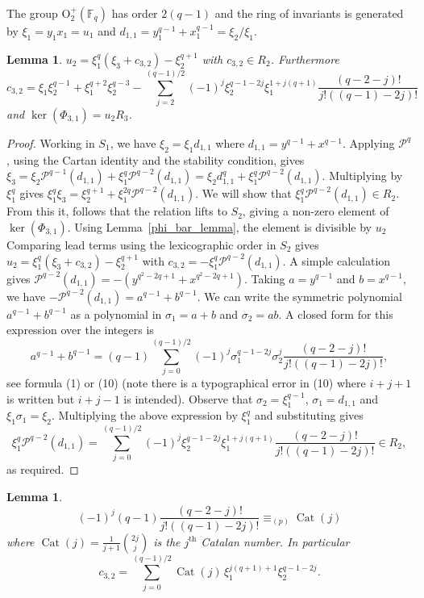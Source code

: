 \documentclass{amsart}
\newcommand{\field}{\mathbb{F}}
\newcommand{\orthp}[2]{{{\text{O}^{+}_{{#1}}(\field_{#2})}}}
\newcommand{\PP}{\mathcal{P}}
\newtheorem{lem}[subsection]{Lemma}
\DeclareMathOperator{\Cat}{{Cat}}
\begin{document}
The group $\orthp{2}{q}$ has order $2(q-1)$ and the ring of invariants is generated by $\xi_1=y_1x_1=u_1$ and $d_{1,1}=y_1^{q-1}+x_1^{q-1}=\xi_2/\xi_1$.


\begin{lem}\label{u2lem} $u_2=\xi_1^q(\xi_3+c_{3,2})-\xi_2^{q+1}$ with $c_{3,2}\in R_2$. 
 Furthermore 
 $$c_{3,2}=\xi_1\xi_2^{q-1}+\xi_1^{q+2}\xi_2^{q-3}-\sum_{j=2}^{(q-1)/2}(-1)^j\xi_2^{q-1-2j}\xi_1^{1+j(q+1)}\frac{(q-2-j)!}{j!((q-1)-2j)!}$$
 and $\ker(\Phi_{3,1})=u_2R_3$.
 \end{lem}
 \begin{proof} Working in $S_1$, we have $\xi_2=\xi_1d_{1,1}$ where $d_{1,1}=y^{q-1}+x^{q-1}$. Applying $\PP^q$, using the Cartan identity and the stability condition, gives
 $\xi_3=\xi_2\PP^{q-1}(d_{1,1})+\xi_1^q\PP^{q-2}(d_{1,1})=\xi_2d_{1,1}^q+\xi_1^q\PP^{q-2}(d_{1,1})$. 
 Multiplying by $\xi_1^q$ gives $\xi_1^q\xi_3=\xi_2^{q+1}+\xi_1^{2q}\PP^{q-2}(d_{1,1})$.
 We will show that $\xi_1^{q}\PP^{q-2}(d_{1,1})\in R_2$. From this it, follows that the relation lifts to $S_2$, giving a non-zero element of $\ker(\Phi_{3,1})$.
 Using Lemma~\ref{phi_bar_lemma}, the element is divisible by $u_2$
 Comparing lead terms using the lexicographic order in $S_2$ gives $u_2=\xi_1^q(\xi_3+c_{3,2})-\xi_2^{q+1}$ with 
 $c_{3,2}=-\xi_1^{q}\PP^{q-2}(d_{1,1})$.
 A simple calculation gives $\PP^{q-2}(d_{1,1})=-(y^{q^2-2q+1}+x^{q^2-2q+1})$. Taking $a=y^{q-1}$ and $b=x^{q-1}$, we have $-\PP^{q-2}(d_{1,1})=a^{q-1}+b^{q-1}$.
 We can write the symmetric polynomial $a^{q-1}+b^{q-1}$ as a polynomial in $\sigma_1=a+b$ and $\sigma_2=ab$. A closed form for this expression over the integers is
 $$a^{q-1}+b^{q-1}=(q-1)\sum_{j=0}^{(q-1)/2}(-1)^j\sigma_1^{q-1-2j}\sigma_2^j\frac{(q-2-j)!}{j!((q-1)-2j)!},$$
 see \cite{gould:99} formula (1) or (10) (note there is a typographical error in \cite{gould:99}(10)
 where $i+j+1$ is written but $i+j-1$ is intended).   
 Observe that $\sigma_2=\xi_1^{q-1}$, $\sigma_1=d_{1,1}$ and $\xi_1\sigma_1=\xi_2$. Multiplying the above expression by $\xi_1^q$ and substituting
 gives
 $$\xi_1^q\PP^{q-2}(d_{1,1})=\sum_{j=0}^{(q-1)/2}(-1)^j\xi_2^{q-1-2j}\xi_1^{1+j(q+1)}\frac{(q-2-j)!}{j!((q-1)-2j)!}\in R_2,$$
 as required.
\end{proof}

\begin{lem} 
    $$(-1)^j (q-1)\frac{(q-2-j)!}{j!((q-1)-2j)!} \equiv_{(p)} \Cat(j)$$
    where $\Cat(j) = \frac{1}{j+1}\binom{2j}{j}$ is the $j^\text{th}$ Catalan number.
In particular $$c_{3,2} = \sum_{j=0}^{(q-1)/2} \Cat(j)\, \xi_1^{j(q+1)+1} \xi_2^{q-1-2j}.$$
\end{lem}
\end{document}
